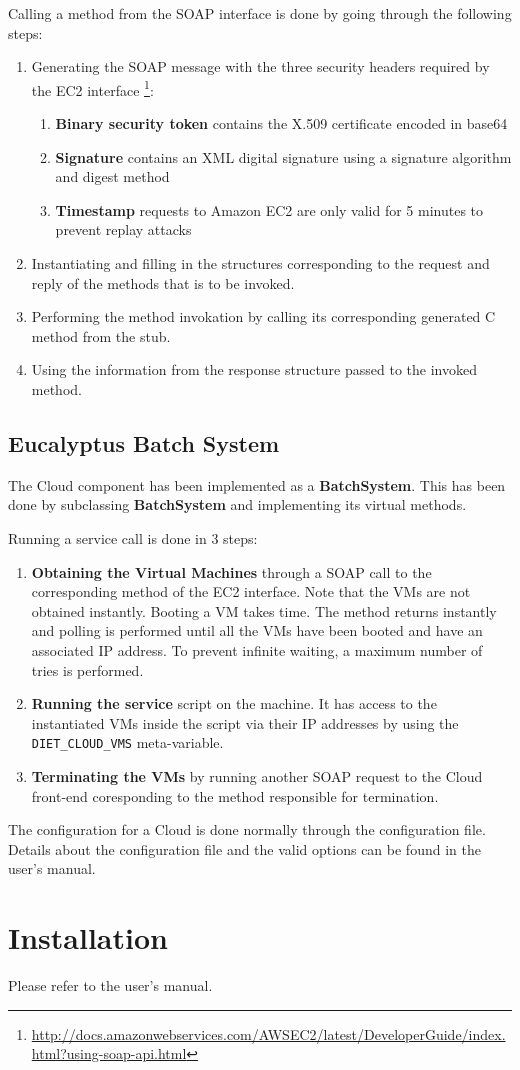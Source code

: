 Calling a method from the SOAP interface is done by going through the following steps:
\begin{enumerate}
\item Generating the SOAP message with the three security headers required by the EC2 interface
\footnote{\url{http://docs.amazonwebservices.com/AWSEC2/latest/DeveloperGuide/index.html?using-soap-api.html}}:
\begin{enumerate}
\item \textbf{Binary security token} contains the X.509 certificate encoded in base64
\item \textbf{Signature} contains an XML digital signature using a signature algorithm and digest method
\item \textbf{Timestamp} requests to Amazon EC2 are only valid for 5 minutes to prevent replay attacks
\end{enumerate}
\item Instantiating and filling in the structures corresponding to the request and reply of the methods that is to be invoked.
\item Performing the method invokation by calling its corresponding generated C method from the stub.
\item Using the information from the response structure passed to the invoked method.
\end{enumerate}

\subsection{Eucalyptus Batch System}

The Cloud component has been implemented as a \textbf{BatchSystem}. This has been done by subclassing
\textbf{BatchSystem} and implementing its virtual methods.

Running a service call is done in 3 steps:
\begin{enumerate}
\item \textbf{Obtaining the Virtual Machines} through a SOAP call to the corresponding method of the EC2
interface. Note that the VMs are not obtained instantly. Booting a VM takes time. The method returns
instantly and polling is performed until all the VMs have been booted and have an associated IP address.
To prevent infinite waiting, a maximum number of tries is performed.
\item \textbf{Running the service} script on the \sed machine. It has access to the instantiated VMs
inside the script via their IP addresses by using the \verb!DIET_CLOUD_VMS! meta-variable.
\item \textbf{Terminating the VMs} by running another SOAP request to the Cloud front-end coresponding
to the method responsible for termination.
\end{enumerate}

The configuration for a \sed Cloud is done normally through the configuration file. Details about
the configuration file and the valid options can be found in the user's manual.

\section{Installation}

Please refer to the user's manual.


